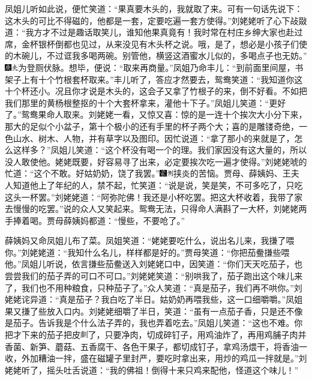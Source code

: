 凤姐儿听如此说，便忙笑道：“果真要木头的，我就取了来。可有一句话先说下：这木头的可比不得磁的，他都是一套，定要吃遍一套方使得。”刘姥姥听了心下敁敠道：“我方才不过是趣话取笑儿，谁知他果真竟有！我时常在村庄乡绅大家也赴过席，金杯银杯倒都也见过，从来没见有木头杯之说。哦，是了，想必是小孩子们使的木碗儿，不过诓我多喝两碗。别管他，横竖这酒蜜水儿似的，多喝点子也无妨。”{\includegraphics[width=3mm]{../Images/00004}\includegraphics[width=3mm]{../Images/00012}\footnotesize \kaishu 为登厕伏脉。}想毕，便说：“取来再商量。”凤姐乃命丰儿：“到前面里间屋，书架子上有十个竹根套杯取来。”丰儿听了，答应才然要去，鸳鸯笑道：“我知道你这十个杯还小。况且你才说是木头的，这会子又拿了竹根子的来，倒不好看。不如把我们那里的黄杨根整抠的十个大套杯拿来，灌他十下子。”凤姐儿笑道：“更好了。”鸳鸯果命人取来。刘姥姥一看，又惊又喜：惊的是一连十个挨次大小分下来，那大的足似个小盆子，第十个极小的还有手里的杯子两个大；喜的是雕镂奇绝，一色山水、树木、人物，并有草字以及图印。因忙说道：“拿了那小的来就是了，怎么这样多？”凤姐儿笑道：“这个杯没有喝一个的理。我们家因没有这大量的，所以没人敢使他。姥姥既要，好容易寻了出来，必定要挨次吃一遍才使得。”刘姥姥唬的忙道：“这个不敢。好姑奶奶，饶了我罢。”{\includegraphics[width=3mm]{../Images/00006}\includegraphics[width=3mm]{../Images/00011}\footnotesize \kaishu 挟炎的苦恼。}贾母、薛姨妈、王夫人知道他上了年纪的人，禁不起，忙笑道：“说是说，笑是笑，不可多吃了，只吃这头一杯罢。”刘姥姥道：“阿弥陀佛！我还是小杯吃罢。把这大杯收着，我带了家去慢慢的吃罢。”说的众人又笑起来。鸳鸯无法，只得命人满斟了一大杯，刘姥姥两手捧着喝。贾母薛姨妈都道：“慢些，不要呛了。”

薛姨妈又命凤姐儿布了菜。凤姐笑道：“姥姥要吃什么，说出名儿来，我搛了喂你。”刘姥姥道：“我知什么名儿，样样都是好的。”贾母笑道：“你把茄鲞搛些喂他。”凤姐儿听说，依言搛些茄鲞送入刘姥姥口中，因笑道：“你们天天吃茄子，也尝尝我们的茄子弄的可口不可口。”刘姥姥笑道：“别哄我了，茄子跑出这个味儿来了，我们也不用种粮食，只种茄子了。”众人笑道：“真是茄子，我们再不哄你。”刘姥姥诧异道：“真是茄子？我白吃了半日。姑奶奶再喂我些，这一口细嚼嚼。”凤姐果又搛了些放入口内。刘姥姥细嚼了半日，笑道：“虽有一点茄子香，只是还不像是茄子。告诉我是个什么法子弄的，我也弄着吃去。”凤姐儿笑道：“这也不难。你把才下来的茄子把皮\includegraphics[width=9.4pt,height=9.4pt,align=c,vshift=1pt]{../images/00027}了，只要净肉，切成碎钉子，用鸡油炸了，再用鸡脯子肉并香菌、新笋、蘑菇、五香腐干、各色干果子，都切成钉子，拿鸡汤煨干，将香油一收，外加糟油一拌，盛在磁罐子里封严，要吃时拿出来，用炒的鸡瓜一拌就是。”刘姥姥听了，摇头吐舌说道：“我的佛祖！倒得十来只鸡来配他，怪道这个味儿！”

